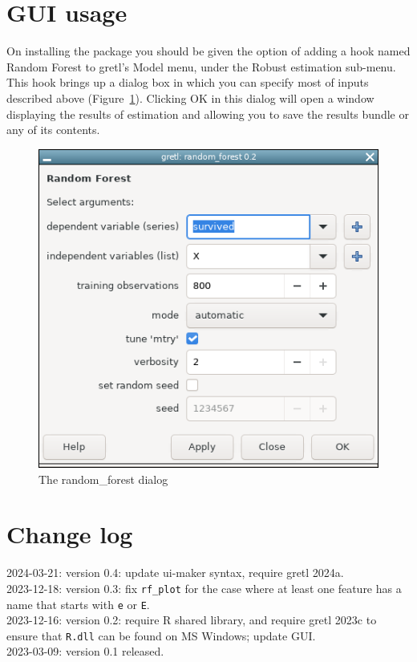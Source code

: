\documentclass{article}
\begin{document}
\section{GUI usage}

On installing the package you should be given the option of adding a
hook named \textsf{Random Forest} to gretl's \textsf{Model} menu,
under the \textsf{Robust estimation} sub-menu. This hook brings up a
dialog box in which you can specify most of inputs described above
(Figure~\ref{fig:dialog}). Clicking \textsf{OK} in this dialog will
open a window displaying the results of estimation and allowing you to
save the results bundle or any of its contents.

\begin{figure}[htbp]
  \centering
  \includegraphics[scale=0.6]{rfgui.png}
  \caption{The random\_forest dialog}
  \label{fig:dialog}
\end{figure}

\section{Change log}

2024-03-21: version 0.4: update ui-maker syntax, require gretl 2024a.\\
2023-12-18: version 0.3: fix \texttt{rf\_plot} for the case where at
least one feature has a name that starts with \texttt{e} or \texttt{E}.\\
2023-12-16: version 0.2: require R shared library, and require gretl
2023c to ensure that \texttt{R.dll} can be found on MS Windows; update GUI.\\
2023-03-09: version 0.1 released.
\end{document}
